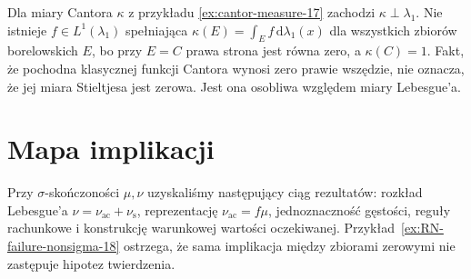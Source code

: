 \begin{przyklad}
Dla miary Cantora $\kappa$ z przykładu
\ref{ex:cantor-measure-17} zachodzi
$\kappa\perp\lambda_1$. Nie istnieje
$f\in L^1(\lambda_1)$ spełniająca
$\kappa(E)=\int_Ef\,\mathrm d\lambda_1(x)$ dla wszystkich
zbiorów borelowskich $E$, bo przy $E=C$ prawa strona
jest równa zero, a $\kappa(C)=1$.
Fakt, że pochodna klasycznej funkcji Cantora wynosi
zero prawie wszędzie, nie oznacza, że jej miara
Stieltjesa jest zerowa. Jest ona osobliwa względem
miary Lebesgue'a.
\end{przyklad}

\section{Mapa implikacji}
Przy $\sigma$-skończoności $\mu,\nu$ uzyskaliśmy
następujący ciąg rezultatów: rozkład Lebesgue'a
$\nu=\nu_{\mathrm{ac}}+\nu_{\mathrm{s}}$,
reprezentację $\nu_{\mathrm{ac}}=f\mu$,
jednoznaczność gęstości, reguły rachunkowe i
konstrukcję warunkowej wartości oczekiwanej.
Przykład~\ref{ex:RN-failure-nonsigma-18} ostrzega,
że sama implikacja między zbiorami zerowymi
nie zastępuje hipotez twierdzenia.
